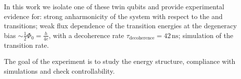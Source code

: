 In  this work  we  isolate one  of  these twin  qubits  and provide  experimental
evidence  for:   strong  anharmonicity  of   the  system  with  respect   to  the
\ilra{} and \ilra{} transitions; weak flux dependence
of      the     transition      energies     at      the     degeneracy      bias
$\sim    \frac{1}{2}\Phi_0     =    \frac{h}{4e}$,    with    a     decoherence    rate
$    \tau_\text{decoherence}   =    42\,    \text{ns}   $;    simulation   of    the
~\ilra~ transition rate.

The goal  of the  experiment is  to study the  energy structure,  compliance with
simulations and check controllability.

